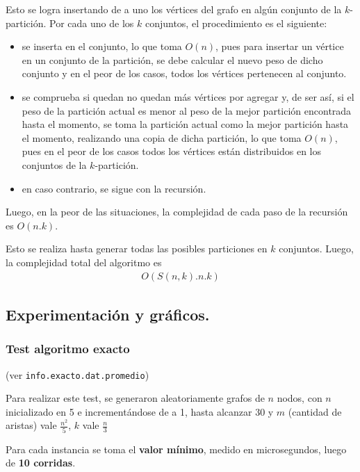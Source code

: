 Esto se logra insertando de a uno los vértices del grafo en algún conjunto de
la $k$-partición. Por cada uno de los $k$ conjuntos, el procedimiento es el
siguiente:
\begin{itemize}
  \item se inserta en el conjunto, lo que toma $O(n)$, pues para insertar un
  vértice en un conjunto de la partición, se debe calcular el nuevo peso de
  dicho conjunto y en el peor de los casos, todos los vértices pertenecen al
  conjunto.
  \item se comprueba si quedan no quedan más vértices por agregar y, de ser
  así, si el peso de la partición actual es menor al peso de la mejor partición
  encontrada hasta el momento, se toma la partición actual como la mejor
  partición hasta el momento, realizando una copia de dicha partición, lo que
  toma $O(n)$, pues en el peor de los casos todos los vértices están
  distribuidos en los conjuntos de la $k$-partición.
  \item en caso contrario, se sigue con la recursión.
\end{itemize}

Luego, en la peor de las situaciones, la complejidad de cada paso de la
recursión es $O(n . k)$.

Esto se realiza hasta generar todas las posibles particiones en $k$ conjuntos.
Luego, la complejidad total del algoritmo es
\begin{align*}
  O(S(n, k) . n . k)
\end{align*}


\newpage \subsection{Experimentación y gráficos.}
\vspace*{0.3cm}

\subsubsection{Test algoritmo exacto}

(ver \verb|info.exacto.dat.promedio|) \medskip

Para realizar este test, se generaron aleatoriamente grafos de $n$ nodos, con  $n$ inicializado en 5 e incrementándose de a 1, hasta alcanzar 30 y $m$
(cantidad de aristas) vale $\frac{n^2}{5}$, $k$ vale $\frac{n}{3}$

Para cada instancia se toma el \textbf{valor mínimo}, medido en microsegundos, luego de \textbf{10 corridas}.

